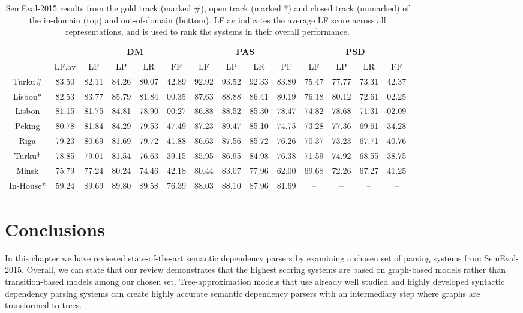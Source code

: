 \begin{table}
\begin{tabular}{@{}cccccccccccccc@{}}
        \\
        \toprule
        \multicolumn{1}{c}{ }
        & \multicolumn{1}{c}{ }
        & \multicolumn{4}{c}{\textbf{DM}}
        & \multicolumn{4}{c}{\textbf{PAS}}
        & \multicolumn{4}{c}{\textbf{PSD}} \\
        \cmidrule(lr){3-6}
        \cmidrule(lr){7-10}
        \cmidrule(lr){11-14}
        &
        LF.av &
        LF & LP & LR & FF &
        LF & LP & LR & PF &
        LF & LP & LR & FF \\
        \midrule
        Turku\# & 83.50 & 82.11 & 84.26 & 80.07 & 42.89 & 92.92 & 93.52 & 92.33 & 83.80 & 75.47 & 77.77 & 73.31 & 42.37 \\
        Lisbon* & 82.53 & 83.77 & 85.79 & 81.84 & 00.35 & 87.63 & 88.88 & 86.41 & 80.19 & 76.18 & 80.12 & 72.61 & 02.25 \\
        Lisbon & 81.15 & 81.75 & 84.81 & 78.90 & 00.27 & 86.88 & 88.52 & 85.30 & 78.47 & 74.82 & 78.68 & 71.31 & 02.09 \\
        Peking & 80.78 & 81.84 & 84.29 & 79.53 & 47.49 & 87.23 & 89.47 & 85.10 & 74.75 & 73.28 & 77.36 & 69.61 & 34.28 \\
        Riga & 79.23 & 80.69 & 81.69 & 79.72 & 41.88 & 86.63 & 87.56 & 85.72 & 76.26 & 70.37 & 73.23 & 67.71 & 40.76 \\
        Turku* & 78.85 & 79.01 & 81.54 & 76.63 & 39.15 & 85.95 & 86.95 & 84.98 & 76.38 & 71.59 & 74.92 & 68.55 & 38.75 \\
        Minsk & 75.79 & 77.24 & 80.24 & 74.46 & 42.18 & 80.44 & 83.07 & 77.96 & 62.00 & 69.68 & 72.26 & 67.27 & 41.25 \\
        In-House* & 59.24 & 89.69 & 89.80 & 89.58 & 76.39 & 88.03 & 88.10 & 87.96 & 81.69 & – & – & – & – \\
        \bottomrule
    \end{tabular}
    \caption{SemEval-2015 results from the gold track (marked \#), open track (marked *) and closed track (unmarked) of the in-domain (top) and out-of-domain (bottom). LF.av indicates the average LF score across all representations, and is used to rank the systems in their overall performance.}
    \label{fig:results}
\end{table}

\section{Conclusions}

In this chapter we have reviewed state-of-the-art semantic dependency parsers by examining a chosen set of parsing systems from SemEval-2015. Overall, we can state that our review demonstrates that the highest scoring systems are based on graph-based models rather than transition-based models among our chosen set. Tree-approximation models that use already well studied and highly developed syntactic dependency parsing systems can create highly accurate semantic dependency parsers with an intermediary step where graphs are transformed to trees.

